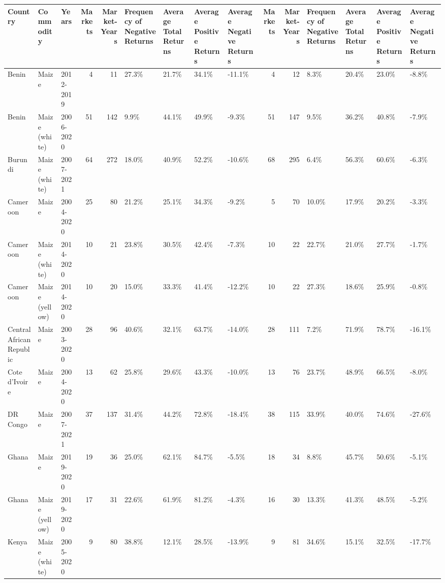 \begin{table}[ht]
\centering
\begin{tabular}{lllrrllllrrllll}
  \hline
Country & Commodity & Years & Markets & Market-Years & Frequency of Negative Returns & Average Total Returns & Average Positive Returns & Average Negative Returns & Markets & Market-Years & Frequency of Negative Returns & Average Total Returns & Average Positive Returns & Average Negative Returns \\ 
  \hline
Benin & Maize & 2012-2019 &   4 &  11 & 27.3\% & 21.7\% & 34.1\% & -11.1\% &   4 &  12 & 8.3\% & 20.4\% & 23.0\% & -8.8\% \\ 
  Benin & Maize (white) & 2006-2020 &  51 & 142 & 9.9\% & 44.1\% & 49.9\% & -9.3\% &  51 & 147 & 9.5\% & 36.2\% & 40.8\% & -7.9\% \\ 
  Burundi & Maize (white) & 2007-2021 &  64 & 272 & 18.0\% & 40.9\% & 52.2\% & -10.6\% &  68 & 295 & 6.4\% & 56.3\% & 60.6\% & -6.3\% \\ 
  Cameroon & Maize & 2004-2020 &  25 &  80 & 21.2\% & 25.1\% & 34.3\% & -9.2\% &   5 &  70 & 10.0\% & 17.9\% & 20.2\% & -3.3\% \\ 
  Cameroon & Maize (white) & 2014-2020 &  10 &  21 & 23.8\% & 30.5\% & 42.4\% & -7.3\% &  10 &  22 & 22.7\% & 21.0\% & 27.7\% & -1.7\% \\ 
  Cameroon & Maize (yellow) & 2014-2020 &  10 &  20 & 15.0\% & 33.3\% & 41.4\% & -12.2\% &  10 &  22 & 27.3\% & 18.6\% & 25.9\% & -0.8\% \\ 
  Central African Republic & Maize & 2003-2020 &  28 &  96 & 40.6\% & 32.1\% & 63.7\% & -14.0\% &  28 & 111 & 7.2\% & 71.9\% & 78.7\% & -16.1\% \\ 
  Cote d'Ivoire & Maize & 2004-2020 &  13 &  62 & 25.8\% & 29.6\% & 43.3\% & -10.0\% &  13 &  76 & 23.7\% & 48.9\% & 66.5\% & -8.0\% \\ 
  DR Congo & Maize & 2007-2021 &  37 & 137 & 31.4\% & 44.2\% & 72.8\% & -18.4\% &  38 & 115 & 33.9\% & 40.0\% & 74.6\% & -27.6\% \\ 
  Ghana & Maize & 2019-2020 &  19 &  36 & 25.0\% & 62.1\% & 84.7\% & -5.5\% &  18 &  34 & 8.8\% & 45.7\% & 50.6\% & -5.1\% \\ 
  Ghana & Maize (yellow) & 2019-2020 &  17 &  31 & 22.6\% & 61.9\% & 81.2\% & -4.3\% &  16 &  30 & 13.3\% & 41.3\% & 48.5\% & -5.2\% \\ 
  Kenya & Maize (white) & 2005-2020 &   9 &  80 & 38.8\% & 12.1\% & 28.5\% & -13.9\% &   9 &  81 & 34.6\% & 15.1\% & 32.5\% & -17.7\% \\ 

\end{tabular}
\end{table}
